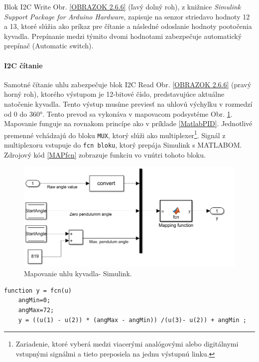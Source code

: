 Blok I2C Write Obr. \ref{OBRAZOK 2.6.6} (ľavý dolný roh), z knižnice \textit{Simulink Support Package for Arduino Hardware}, zapisuje na senzor striedavo hodnoty 12 a 13, ktoré slúžia ako príkaz pre čítanie a následné odoslanie hodnoty pootočenia kyvadla. Prepínanie medzi týmito dvomi hodnotami zabezpečuje automatický prepínač (Automatic switch). 

\paragraph{I2C čítanie}

Samotné čítanie uhlu zabezpečuje blok I2C Read Obr. \ref{OBRAZOK 2.6.6} (pravý horný roh), ktorého výstupom je 12-bitové číslo, predstavujúce aktuálne natočenie kyvadla. Tento výstup musíme previesť na uhlovú výchylku v rozmedzí od 0 do 360°. Tento prevod sa vykonáva v mapovacom podsystéme Obr. \ref{OBRAZOK 2.6.7}. Mapovanie funguje na rovnakom princípe ako v príklade \ref{MatlabPID}. Jednotlivé premenné vchádzajú do bloku \verb*|MUX|, ktorý slúži ako multiplexer\footnote[9]{Zariadenie, ktoré vyberá medzi viacerými analógovými alebo digitálnymi vstupnými signálmi a tieto preposiela na jednu výstupnú linku.}. Signál z multiplexoru vstupuje do \verb|fcn bloku|, ktorý prepája Simulink s MATLABOM. Zdrojový kód \ref{MAPfcn} zobrazuje funkciu vo vnútri tohoto bloku. 


\begin{figure}[!tbh]
	\centering
	\includegraphics[width=\textwidth]{obr/SensMap.png}
	\caption{Mapovanie uhlu kyvadla- Simulink.}\label{OBRAZOK 2.6.7}
\end{figure}


\begin{lstlisting}[caption={Mapovacia funkcia vo fcn bloku.},captionpos=b,label=MAPfcn]
	function y = fcn(u)
	angMin=0;
	angMax=72;
	y = ((u(1) - u(2)) * (angMax - angMin)) /(u(3)- u(2)) + angMin ;
\end{lstlisting}



